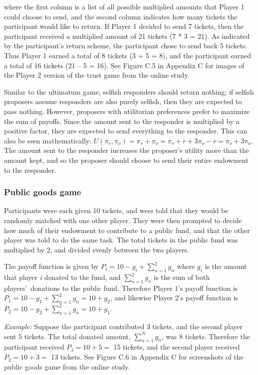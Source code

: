 \documentclass[12pt]{article}
\begin{document}
\noindent where the first column is a list of all possible multiplied amounts that Player 1 could choose to send, and the second column indicates how many tickets the participant would like to return. If Player 1 decided to send 7 tickets, then the participant received a multiplied amount of 21 tickets (7 * 3 = 21). As indicated by the participant\rq s return scheme, the participant chose to send back 5 tickets. Thus Player 1 earned a total of 8 tickets (3 + 5 =  8), and the participant earned a total of 16 tickets (21 -- 5 = 16). See Figure C.5 in Appendix C for images of the Player 2 version of the trust game from the online study.

Similar to the ultimatum game, selfish responders should return nothing; if selfish proposers assume responders are also purely selfish, then they are expected to pass nothing. However, proposers with utilitarian preferences prefer to maximize the sum of payoffs. Since the amount sent to the responder is multiplied by a positive factor, they are expected to send everything to the responder. This can also be seen mathematically: \(U(\pi_{s}, \pi_{o}) = \pi_{s} + \pi_{o} = \pi_{s} + r + 3\pi_{o} - r = \pi_{s} + 3\pi_{o} \). The amount sent to the responder increases the proposer\rq s utility more than the amount kept, and so the proposer should choose to send their entire endowment to the responder.
	
\subsubsection{Public goods game}

Participants were each given 10 tickets, and were told that they would be randomly matched with one other player. They were then prompted to decide how much of their endowment to contribute to a public fund, and that the other player was told to do the same task. The total tickets in the public fund was multiplied by 2, and divided evenly between the two players.

The payoff function is given by \( P_{i} = 10 - g_{i} + \sum_{n=1}^{2} g_{n}\) where \(g_{i}\) is the amount that player \textit{i} donated to the fund, and \(\sum_{n=1}^{2}g_{n}\) is the sum of both players\rq \ donations to the public fund. Therefore Player 1\rq s payoff function is \( P_{1} = 10 - g_{1} + \sum_{n=1}^{2} g_{n} = 10 + g_{2}\), and likewise Player 2\rq s payoff function is \( P_{2} = 10 - g_{2} + \sum_{n=1}^{2} g_{n} = 10 + g_{1}\).

\textit{Example:} Suppose the participant contributed 3 tickets, and the second player sent 5 tickets. The total donated amount, \(\sum_{n=1}^{N} g_{n}\), was 8 tickets. Therefore the participant received \( P_{1} = 10 + 5  = \) 15 tickets, and the second player received \( P_{2} = 10 + 3 = \) 13 tickets. See Figure C.6 in Appendix C for screenshots of the public goods game from the online study.
\end{document}
